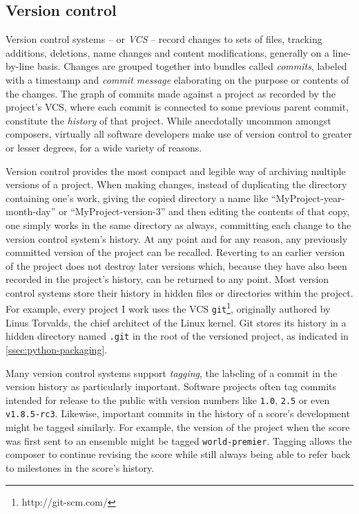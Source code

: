 \subsection{Version control}
\label{ssec:version-control}


Version control systems\cite{loeliger2009git} -- or \emph{VCS} -- record
changes to sets of files, tracking additions, deletions, name changes and
content modifications, generally on a line-by-line basis. Changes are grouped
together into bundles called \emph{commits}, labeled with a timestamp and
\emph{commit message} elaborating on the purpose or contents of the changes.
The graph of commits made against a project as recorded by the project's VCS,
where each commit is connected to some previous parent commit, constitute the
\emph{history} of that project. While anecdotally uncommon amongst composers,
virtually all software developers make use of version control to greater or
lesser degrees, for a wide variety of reasons.

Version control provides the most compact and legible way of archiving multiple
versions of a project. When making changes, instead of duplicating the
directory containing one's work, giving the copied directory a name like
\enquote{MyProject-year-month-day} or \enquote{MyProject-version-3} and then
editing the contents of that copy, one simply works in the same directory as
always, committing each change to the version control system's history. At any
point and for any reason, any previously committed version of the project can
be recalled. Reverting to an earlier version of the project does not destroy
later versions which, because they have also been recorded in the project's
history, can be returned to any point. Most version control systems store their
history in hidden files or directories within the project. For example, every
project I work uses the VCS \texttt{git}\footnote{http://git-scm.com/},
originally authored by Linus Torvalds, the chief architect of the Linux kernel.
Git stores its history in a hidden directory named \texttt{.git} in the root of
the versioned project, as indicated in \autoref{ssec:python-packaging}.

Many version control systems support \emph{tagging}, the labeling of a commit
in the version history as particularly important. Software projects often tag
commits intended for release to the public with version numbers like
\texttt{1.0}, \texttt{2.5} or even \texttt{v1.8.5-rc3}. Likewise, important
commits in the history of a score's development might be tagged similarly. For
example, the version of the project when the score was first sent to an
ensemble might be tagged \texttt{world-premier}. Tagging allows the composer to
continue revising the score while still always being able to refer back to
milestones in the score's history.

